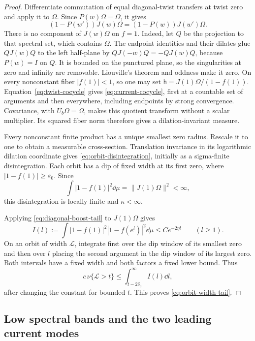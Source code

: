 \begin{proof}
Differentiate commutation of equal diagonal-twist transfers at twist
zero and apply it to $\Omega$.  Since $P(w)\Omega=\Omega$, it gives
\begin{equation}\label{eq:twist-cocycle}
 (1-P(w'))J(w)\Omega=(1-P(w))J(w')\Omega.
\end{equation}
There is no component of $J(w)\Omega$ on $f=1$.  Indeed, let $Q$ be
the projection to that spectral set, which contains $\Omega$.
The endpoint identities and their dilates glue $QJ(w)Q$ to the left
half-plane by $QJ(-w)Q=-QJ(w)Q$, because $P(w)=I$ on $Q$.
It is bounded on the punctured plane, so the singularities at zero
and infinity are removable.  Liouville's theorem and oddness make it
zero.  On every
nonconstant fiber $|f(1)|<1$, so one may set
$\mathsf h=J(1)\Omega/(1-f(1))$.  Equation~\eqref{eq:twist-cocycle}
gives \eqref{eq:current-cocycle}, first at a countable set of arguments
and then everywhere, including endpoints by strong convergence.
Covariance, with $U_b\Omega=\Omega$, makes this quotient transform
without a scalar multiplier.  Its squared fiber norm therefore gives
a dilation-invariant measure.

Every nonconstant finite product has a unique smallest zero radius.
Rescale it to one to obtain a measurable cross-section.  Translation
invariance in its logarithmic dilation coordinate gives
\eqref{eq:orbit-disintegration}, initially as a sigma-finite
disintegration.  Each orbit has a dip of fixed width at its first zero,
where $|1-f(1)|\ge\varepsilon_0$.  Since
\[
 \int |1-f(1)|^2\dd\mu=\|J(1)\Omega\|^2<\infty,
\]
this disintegration is locally finite and $\kappa<\infty$.

Applying \eqref{eq:diagonal-boost-tail} to $J(1)\Omega$ gives
\begin{equation}\label{eq:two-dip-bound}
 I(l):=\int |1-f(1)|^2|1-f(e^l)|^2\dd\mu
 \le Ce^{-2\eta l}\qquad(l\ge1).
\end{equation}
On an orbit of width $\mathcal L$, integrate first over the dip window
of its smallest zero and then over $l$ placing the second argument in
the dip window of its largest zero.  Both intervals have a fixed width
and both factors a fixed lower bound.  Thus
\[
 c\,\nu\{\mathcal L>t\}
 \le \int_{t-2\delta_0}^{\infty} I(l)\dd l,
\]
after changing the constant for bounded $t$.  This proves
\eqref{eq:orbit-width-tail}.
\end{proof}

\subsection{Low spectral bands and the two leading current modes}

